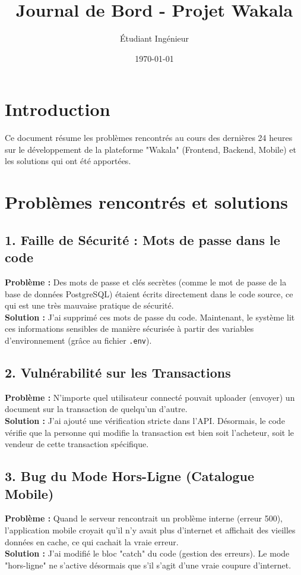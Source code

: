\documentclass[12pt, a4paper]{article}
\title{Journal de Bord - Projet Wakala}
\author{Étudiant Ingénieur}
\date{\today}
\begin{document}
\maketitle

\section{Introduction}
Ce document résume les problèmes rencontrés au cours des dernières 24 heures sur le développement de la plateforme "Wakala" (Frontend, Backend, Mobile) et les solutions qui ont été apportées.

\section{Problèmes rencontrés et solutions}

\subsection{1. Faille de Sécurité : Mots de passe dans le code}
\textbf{Problème :} Des mots de passe et clés secrètes (comme le mot de passe de la base de données PostgreSQL) étaient écrits directement dans le code source, ce qui est une très mauvaise pratique de sécurité. \\
\textbf{Solution :} J'ai supprimé ces mots de passe du code. Maintenant, le système lit ces informations sensibles de manière sécurisée à partir des variables d'environnement (grâce au fichier \texttt{.env}).

\subsection{2. Vulnérabilité sur les Transactions}
\textbf{Problème :} N'importe quel utilisateur connecté pouvait uploader (envoyer) un document sur la transaction de quelqu'un d'autre. \\
\textbf{Solution :} J'ai ajouté une vérification stricte dans l'API. Désormais, le code vérifie que la personne qui modifie la transaction est bien soit l'acheteur, soit le vendeur de cette transaction spécifique. 

\subsection{3. Bug du Mode Hors-Ligne (Catalogue Mobile)}
\textbf{Problème :} Quand le serveur rencontrait un problème interne (erreur 500), l'application mobile croyait qu'il n'y avait plus d'internet et affichait des vieilles données en cache, ce qui cachait la vraie erreur. \\
\textbf{Solution :} J'ai modifié le bloc "catch" du code (gestion des erreurs). Le mode "hors-ligne" ne s'active désormais que s'il s'agit d'une vraie coupure d'internet.
\end{document}
